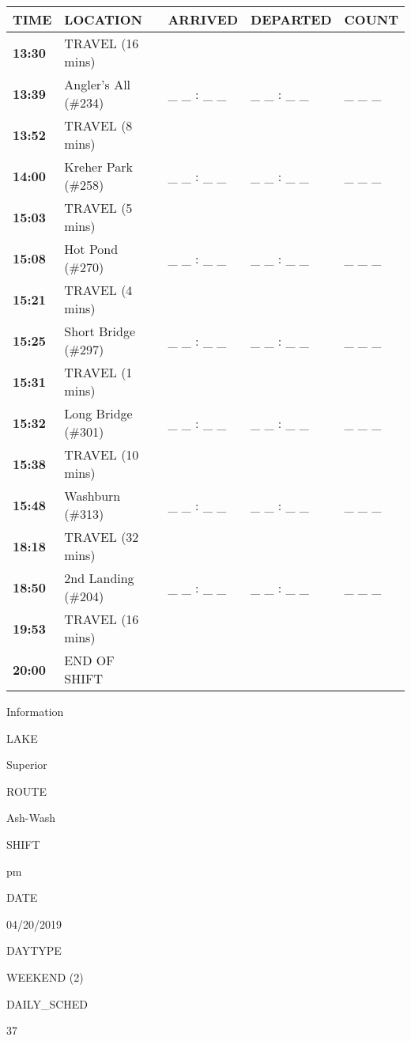\documentclass[]{article}
\begin{document}
\begin{tabular}{>{\bfseries}lllll}
\toprule
\textbf{TIME} & \textbf{LOCATION} & \textbf{ARRIVED} & \textbf{DEPARTED} & \textbf{COUNT}\\
\midrule
13:30 & TRAVEL (16 mins) &  &  & \\
13:39 & Angler's All (\#234) & \_ \_ : \_ \_ & \_ \_ : \_ \_ & \_ \_ \_\\
13:52 & TRAVEL (8 mins) &  &  & \\
14:00 & Kreher Park (\#258) & \_ \_ : \_ \_ & \_ \_ : \_ \_ & \_ \_ \_\\
15:03 & TRAVEL (5 mins) &  &  & \\
15:08 & Hot Pond (\#270) & \_ \_ : \_ \_ & \_ \_ : \_ \_ & \_ \_ \_\\
15:21 & TRAVEL (4 mins) &  &  & \\
15:25 & Short Bridge (\#297) & \_ \_ : \_ \_ & \_ \_ : \_ \_ & \_ \_ \_\\
15:31 & TRAVEL (1 mins) &  &  & \\
15:32 & Long Bridge (\#301) & \_ \_ : \_ \_ & \_ \_ : \_ \_ & \_ \_ \_\\
15:38 & TRAVEL (10 mins) &  &  & \\
15:48 & Washburn (\#313) & \_ \_ : \_ \_ & \_ \_ : \_ \_ & \_ \_ \_\\
18:18 & TRAVEL (32 mins) &  &  & \\
18:50 & 2nd Landing (\#204) & \_ \_ : \_ \_ & \_ \_ : \_ \_ & \_ \_ \_\\
19:53 & TRAVEL (16 mins) &  &  & \\
20:00 & END OF SHIFT &  &  & \\
\bottomrule
\end{tabular}\newpage

Information

LAKE

Superior

ROUTE

Ash-Wash

SHIFT

pm

DATE

04/20/2019

DAYTYPE

WEEKEND (2)

DAILY\_SCHED

37

\vspace{24pt}
\end{document}
